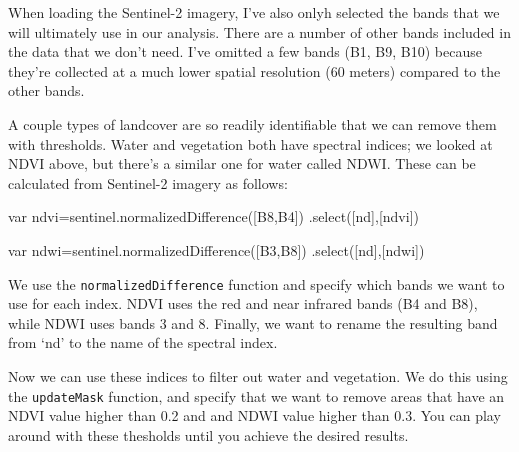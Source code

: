 \documentclass[
  letterpaper,
  DIV=11,
  numbers=noendperiod]{scrreprt}
\newenvironment{Shaded}{\begin{snugshade}}{\end{snugshade}}
\newcommand{\FunctionTok}[1]{\textcolor[rgb]{0.28,0.35,0.67}{#1}}
\newcommand{\KeywordTok}[1]{\textcolor[rgb]{0.00,0.23,0.31}{#1}}
\newcommand{\NormalTok}[1]{\textcolor[rgb]{0.00,0.23,0.31}{#1}}
\newcommand{\OperatorTok}[1]{\textcolor[rgb]{0.37,0.37,0.37}{#1}}
\newcommand{\StringTok}[1]{\textcolor[rgb]{0.13,0.47,0.30}{#1}}
\begin{document}
When loading the Sentinel-2 imagery, I've also onlyh selected the bands
that we will ultimately use in our analysis. There are a number of other
bands included in the data that we don't need. I've omitted a few bands
(B1, B9, B10) because they're collected at a much lower spatial
resolution (60 meters) compared to the other bands.

A couple types of landcover are so readily identifiable that we can
remove them with thresholds. Water and vegetation both have spectral
indices; we looked at NDVI above, but there's a similar one for water
called NDWI. These can be calculated from Sentinel-2 imagery as follows:

\begin{Shaded}
\begin{Highlighting}[]
\KeywordTok{var}\NormalTok{ ndvi}\OperatorTok{=}\NormalTok{sentinel}\OperatorTok{.}\FunctionTok{normalizedDifference}\NormalTok{([}\StringTok{\textquotesingle{}B8\textquotesingle{}}\OperatorTok{,}\StringTok{\textquotesingle{}B4\textquotesingle{}}\NormalTok{])}
                  \OperatorTok{.}\FunctionTok{select}\NormalTok{([}\StringTok{\textquotesingle{}nd\textquotesingle{}}\NormalTok{]}\OperatorTok{,}\NormalTok{[}\StringTok{\textquotesingle{}ndvi\textquotesingle{}}\NormalTok{])}

\KeywordTok{var}\NormalTok{ ndwi}\OperatorTok{=}\NormalTok{sentinel}\OperatorTok{.}\FunctionTok{normalizedDifference}\NormalTok{([}\StringTok{\textquotesingle{}B3\textquotesingle{}}\OperatorTok{,}\StringTok{\textquotesingle{}B8\textquotesingle{}}\NormalTok{])}
                  \OperatorTok{.}\FunctionTok{select}\NormalTok{([}\StringTok{\textquotesingle{}nd\textquotesingle{}}\NormalTok{]}\OperatorTok{,}\NormalTok{[}\StringTok{\textquotesingle{}ndwi\textquotesingle{}}\NormalTok{])}
\end{Highlighting}
\end{Shaded}

We use the \texttt{normalizedDifference} function and specify which
bands we want to use for each index. NDVI uses the red and near infrared
bands (B4 and B8), while NDWI uses bands 3 and 8. Finally, we want to
rename the resulting band from `nd' to the name of the spectral index.

Now we can use these indices to filter out water and vegetation. We do
this using the \texttt{updateMask} function, and specify that we want to
remove areas that have an NDVI value higher than 0.2 and and NDWI value
higher than 0.3. You can play around with these thesholds until you
achieve the desired results.
\end{document}
